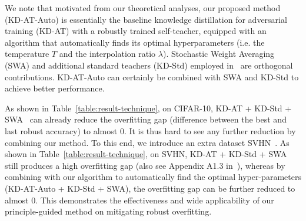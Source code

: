 


We note that motivated from our theoretical analyses, our proposed method (KD-AT-Auto) is essentially the baseline knowledge distillation for adversarial training (KD-AT) with a robustly trained self-teacher, equipped with an algorithm that automatically finds its optimal hyperparameters (i.e. the temperature $T$ and the interpolation ratio $\lambda$). Stochastic Weight Averaging (SWA) and additional standard teachers (KD-Std) employed in~\citep{chen2021robust} are orthogonal contributions. KD-AT-Auto can certainly be combined with SWA and KD-Std to achieve better performance. 

As shown in Table~\ref{table:result-technique}, on CIFAR-10, KD-AT + KD-Std + SWA~\citep{chen2021robust} can already reduce the overfitting gap (difference between the best and last robust accuracy) to almost $0$. %
It is thus hard to see any further reduction by combining our method. 
To this end, we introduce an extra dataset SVHN~\citep{Netzer2011ReadingDI}. As shown in Table~\ref{table:result-technique}, on SVHN, KD-AT + KD-Std + SWA still produces a high overfitting gap (also see Appendix A1.3 in~\citep{chen2021robust}), whereas by combining with our algorithm to automatically find the optimal hyper-parameters (KD-AT-Auto + KD-Std + SWA), the overfitting gap can be further reduced to almost $0$. This demonstrates the effectiveness and wide applicability of our principle-guided method on mitigating robust overfitting. 



